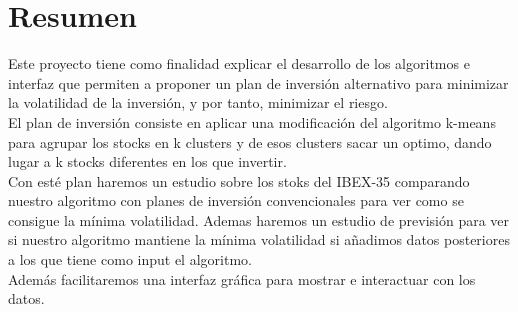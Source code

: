 \documentclass[12pt,a4paper]{article}
\begin{document}
	\section{Resumen}
	\vspace{1cm}
Este proyecto tiene como finalidad explicar el desarrollo de los algoritmos e interfaz que permiten a \cite{Principal} proponer un plan de inversión alternativo para minimizar la volatilidad de la inversión, y por tanto, minimizar el riesgo.\\
El plan de inversión consiste en aplicar una modificación del algoritmo k-means para agrupar los stocks en k clusters y de esos clusters sacar un optimo, dando lugar a k stocks diferentes en los que invertir.\\
Con esté plan haremos un estudio sobre los stoks del IBEX-35 comparando nuestro algoritmo con planes de inversión convencionales para ver como se consigue la mínima volatilidad. Ademas haremos un estudio de previsión para ver si nuestro algoritmo mantiene la mínima volatilidad si añadimos datos posteriores a los que tiene como input el algoritmo.\\
Además facilitaremos una interfaz gráfica para mostrar e interactuar con los datos.\\
\pagebreak
	\vspace{1cm}
\end{document}
